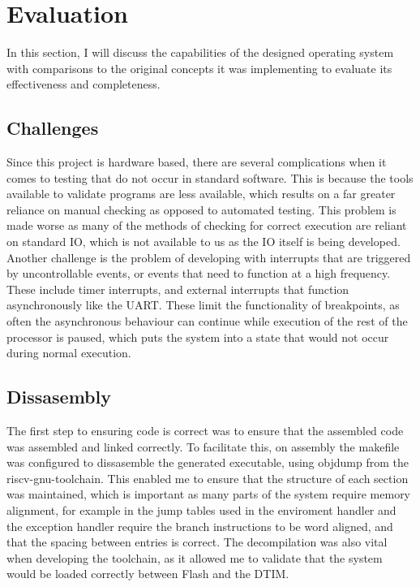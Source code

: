 \chapter[Evaluation]{Evaluation}
\label{cha:eval}
In this section, I will discuss the capabilities of the designed operating system with comparisons to the original concepts it was implementing to evaluate its effectiveness and completeness.
\section{Challenges}
Since this project is hardware based, there are several complications when it comes to testing that do not occur in standard software. This is because the tools available to validate programs are less available, which results on a far greater reliance on manual checking as opposed to automated testing. This problem is made worse as many of the methods of checking for correct execution are reliant on standard IO, which is not available to us as the IO itself is being developed.\\
Another challenge is the problem of developing with interrupts that are triggered by uncontrollable events, or events that need to function at a high frequency. These include timer interrupts, and external interrupts that function asynchronously like the UART. These limit the functionality of breakpoints, as often the asynchronous behaviour can continue while execution of the rest of the processor is paused, which puts the system into a state that would not occur during normal execution.
\section{Dissasembly}%
The first step to ensuring code is correct was to ensure that the assembled code was assembled and linked correctly. To facilitate this, on assembly the makefile was configured to dissasemble the generated executable, using objdump from the riscv-gnu-toolchain. This enabled me to ensure that the structure of each section was maintained, which is important as many parts of the system require memory alignment, for example in the jump tables used in the enviroment handler and the exception handler require the branch instructions to be word aligned, and that the spacing between entries is correct. The decompilation was also vital when developing the toolchain, as it allowed me to validate that the system would be loaded correctly between Flash and the DTIM.
